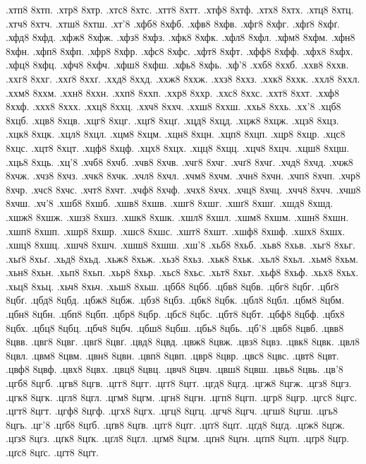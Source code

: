 {.хтп8 8хтп.
.хтр8 8хтр.
.хтс8 8хтс.
.хтт8 8хтт.
.хтф8 8хтф.
.хтх8 8хтх.
.хтц8 8хтц.
.хтч8 8хтч.
.хтш8 8хтш.
.хт'8
.хфб8 8хфб.
.хфв8 8хфв.
.хфг8 8хфг.
.хфґ8 8хфґ.
.хфд8 8хфд.
.хфж8 8хфж.
.хфз8 8хфз.
.хфк8 8хфк.
.хфл8 8хфл.
.хфм8 8хфм.
.хфн8 8хфн.
.хфп8 8хфп.
.хфр8 8хфр.
.хфс8 8хфс.
.хфт8 8хфт.
.хфф8 8хфф.
.хфх8 8хфх.
.хфц8 8хфц.
.хфч8 8хфч.
.хфш8 8хфш.
.хфь8 8хфь.
.хф'8
.ххб8 8ххб.
.ххв8 8ххв.
.ххг8 8ххг.
.ххґ8 8ххґ.
.ххд8 8ххд.
.ххж8 8ххж.
.ххз8 8ххз.
.ххк8 8ххк.
.ххл8 8ххл.
.ххм8 8ххм.
.ххн8 8ххн.
.ххп8 8ххп.
.ххр8 8ххр.
.ххс8 8ххс.
.ххт8 8ххт.
.ххф8 8ххф.
.ххх8 8ххх.
.ххц8 8ххц.
.ххч8 8ххч.
.ххш8 8ххш.
.ххь8 8ххь.
.хх'8
.хцб8 8хцб.
.хцв8 8хцв.
.хцг8 8хцг.
.хцґ8 8хцґ.
.хцд8 8хцд.
.хцж8 8хцж.
.хцз8 8хцз.
.хцк8 8хцк.
.хцл8 8хцл.
.хцм8 8хцм.
.хцн8 8хцн.
.хцп8 8хцп.
.хцр8 8хцр.
.хцс8 8хцс.
.хцт8 8хцт.
.хцф8 8хцф.
.хцх8 8хцх.
.хцц8 8хцц.
.хцч8 8хцч.
.хцш8 8хцш.
.хць8 8хць.
.хц'8
.хчб8 8хчб.
.хчв8 8хчв.
.хчг8 8хчг.
.хчґ8 8хчґ.
.хчд8 8хчд.
.хчж8 8хчж.
.хчз8 8хчз.
.хчк8 8хчк.
.хчл8 8хчл.
.хчм8 8хчм.
.хчн8 8хчн.
.хчп8 8хчп.
.хчр8 8хчр.
.хчс8 8хчс.
.хчт8 8хчт.
.хчф8 8хчф.
.хчх8 8хчх.
.хчц8 8хчц.
.хчч8 8хчч.
.хчш8 8хчш.
.хч'8
.хшб8 8хшб.
.хшв8 8хшв.
.хшг8 8хшг.
.хшґ8 8хшґ.
.хшд8 8хшд.
.хшж8 8хшж.
.хшз8 8хшз.
.хшк8 8хшк.
.хшл8 8хшл.
.хшм8 8хшм.
.хшн8 8хшн.
.хшп8 8хшп.
.хшр8 8хшр.
.хшс8 8хшс.
.хшт8 8хшт.
.хшф8 8хшф.
.хшх8 8хшх.
.хшц8 8хшц.
.хшч8 8хшч.
.хшш8 8хшш.
.хш'8
.хьб8 8хьб.
.хьв8 8хьв.
.хьг8 8хьг.
.хьґ8 8хьґ.
.хьд8 8хьд.
.хьж8 8хьж.
.хьз8 8хьз.
.хьк8 8хьк.
.хьл8 8хьл.
.хьм8 8хьм.
.хьн8 8хьн.
.хьп8 8хьп.
.хьр8 8хьр.
.хьс8 8хьс.
.хьт8 8хьт.
.хьф8 8хьф.
.хьх8 8хьх.
.хьц8 8хьц.
.хьч8 8хьч.
.хьш8 8хьш.
.цбб8 8цбб.
.цбв8 8цбв.
.цбг8 8цбг.
.цбґ8 8цбґ.
.цбд8 8цбд.
.цбж8 8цбж.
.цбз8 8цбз.
.цбк8 8цбк.
.цбл8 8цбл.
.цбм8 8цбм.
.цбн8 8цбн.
.цбп8 8цбп.
.цбр8 8цбр.
.цбс8 8цбс.
.цбт8 8цбт.
.цбф8 8цбф.
.цбх8 8цбх.
.цбц8 8цбц.
.цбч8 8цбч.
.цбш8 8цбш.
.цбь8 8цбь.
.цб'8
.цвб8 8цвб.
.цвв8 8цвв.
.цвг8 8цвг.
.цвґ8 8цвґ.
.цвд8 8цвд.
.цвж8 8цвж.
.цвз8 8цвз.
.цвк8 8цвк.
.цвл8 8цвл.
.цвм8 8цвм.
.цвн8 8цвн.
.цвп8 8цвп.
.цвр8 8цвр.
.цвс8 8цвс.
.цвт8 8цвт.
.цвф8 8цвф.
.цвх8 8цвх.
.цвц8 8цвц.
.цвч8 8цвч.
.цвш8 8цвш.
.цвь8 8цвь.
.цв'8
.цгб8 8цгб.
.цгв8 8цгв.
.цгг8 8цгг.
.цгґ8 8цгґ.
.цгд8 8цгд.
.цгж8 8цгж.
.цгз8 8цгз.
.цгк8 8цгк.
.цгл8 8цгл.
.цгм8 8цгм.
.цгн8 8цгн.
.цгп8 8цгп.
.цгр8 8цгр.
.цгс8 8цгс.
.цгт8 8цгт.
.цгф8 8цгф.
.цгх8 8цгх.
.цгц8 8цгц.
.цгч8 8цгч.
.цгш8 8цгш.
.цгь8 8цгь.
.цг'8
.цґб8 8цґб.
.цґв8 8цґв.
.цґг8 8цґг.
.цґґ8 8цґґ.
.цґд8 8цґд.
.цґж8 8цґж.
.цґз8 8цґз.
.цґк8 8цґк.
.цґл8 8цґл.
.цґм8 8цґм.
.цґн8 8цґн.
.цґп8 8цґп.
.цґр8 8цґр.
.цґс8 8цґс.
.цґт8 8цґт.
}
